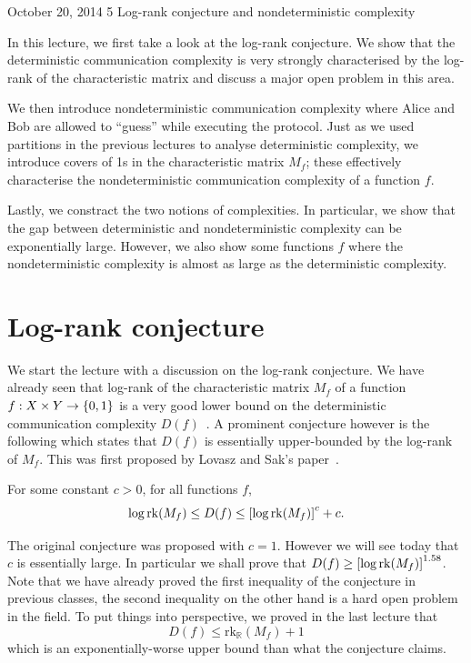 \documentclass[usletter]{article}
\newcommand{\reals}{\mathbb{R}}
\providecommand\sqbrac[1]{\ensuremath \left[#1\right]}
\providecommand\cbrac[1]{\ensuremath \left\{#1\right\}}
\newcommand{\X}{X}
\newcommand{\Y}{Y}
\newcommand{\rk}{\mathrm{rk}}
\newcommand{\mf}{M_f}
\newcommand{\df}{D(f)}
\begin{document}
           {October 20, 2014}               %
           {5}                              %
           {Log-rank conjecture and nondeterministic complexity}   %

\noindent

In this lecture, we first take a look at the log-rank conjecture. We show that the deterministic communication complexity is very strongly characterised by the log-rank of the characteristic matrix and discuss a major open problem in this area.

We then introduce nondeterministic communication complexity where Alice and Bob are allowed to ``guess'' while executing the protocol. Just as we used partitions in the previous lectures to analyse deterministic complexity, we introduce covers of 1s in the characteristic matrix $\mf$; these effectively characterise the nondeterministic communication complexity of a function $f$.

Lastly, we constract the two notions of complexities. In particular, we show that the gap between deterministic and nondeterministic complexity can be exponentially large. However, we also show some functions $f$ where the nondeterministic complexity is almost as large as the deterministic complexity.

\section{Log-rank conjecture}
\label{sec:log_rank}

We start the lecture with a discussion on the log-rank conjecture. We have already seen that log-rank of the characteristic matrix $\mf$ of a function $f : \X \times \Y \to \cbrac{0,1}$ is a very good lower bound on the deterministic communication complexity $\df$~\cite{mehlhorn1982vegas}. A prominent conjecture however is the following which states that $\df$ is essentially upper-bounded by the log-rank of $\mf$. This was first proposed by Lovasz and Sak's paper~\cite{lovasz1988lattices}.

\begin{conjecture}
\label{conj:log_rank}
For some constant $c > 0$, for all functions $f$,
$$
\log \rk (\mf) \leq \df \leq \sqbrac{\log \rk (\mf)}^c + c.
$$
\end{conjecture}
\begin{remark}
The original conjecture was proposed with $c=1$. However we will see today that $c$ is essentially large. In particular we shall prove that $\df \geq \sqbrac{\log \rk (\mf)}^{1.58}$.
Note that we have already proved the first inequality of the conjecture in previous classes, the second inequality on the other hand is a hard open problem in the field. To put things into perspective, we proved in the last lecture that
$$
\df \leq \rk_\reals (\mf) + 1
$$
which is an exponentially-worse upper bound than what the conjecture claims.
\end{remark}
\end{document}
